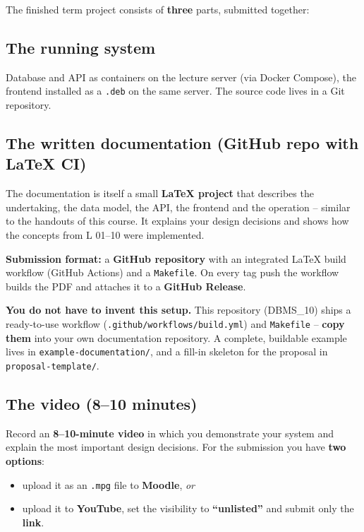 \documentclass[11pt,a4paper]{article}
\begin{document}
The finished term project consists of \textbf{three} parts, submitted together:

\subsection{The running system}

Database and API as containers on the lecture server (via Docker Compose), the
frontend installed as a \texttt{.deb} on the same server. The source code lives
in a Git repository.

\subsection{The written documentation (GitHub repo with LaTeX CI)}

The documentation is itself a small \textbf{LaTeX project} that describes the
undertaking, the data model, the API, the frontend and the operation -- similar
to the handouts of this course. It explains your design decisions and shows how
the concepts from L 01--10 were implemented.

\textbf{Submission format:} a \textbf{GitHub repository} with an integrated
LaTeX build workflow (GitHub Actions) and a \texttt{Makefile}. On every tag push
the workflow builds the PDF and attaches it to a \textbf{GitHub Release}.

\begin{infobox}
\textbf{You do not have to invent this setup.} This repository (DBMS\_10) ships a
ready-to-use workflow (\texttt{.github/workflows/build.yml}) and \texttt{Makefile}
-- \textbf{copy them} into your own documentation repository. A complete,
buildable example lives in \texttt{example-documentation/}, and a fill-in
skeleton for the proposal in \texttt{proposal-template/}.
\end{infobox}

\subsection{The video (8--10 minutes)}

Record an \textbf{8--10-minute video} in which you demonstrate your system and
explain the most important design decisions. For the submission you have
\textbf{two options}:

\begin{itemize}[leftmargin=1.4em, topsep=2pt]
  \item upload it as an \texttt{.mpg} file to \textbf{Moodle}, \emph{or}
  \item upload it to \textbf{YouTube}, set the visibility to
        \textbf{``unlisted''} and submit only the \textbf{link}.
\end{itemize}
\end{document}
